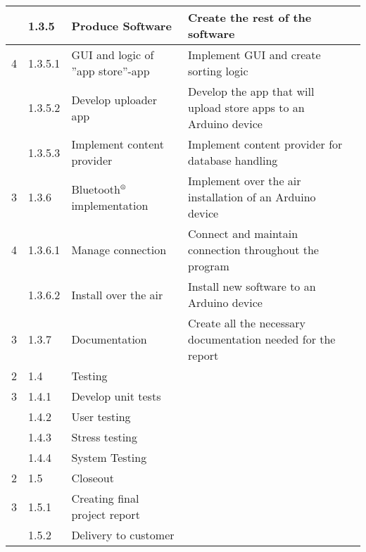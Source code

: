 \begin{longtable}{|m{}|m{}|m{}|m{}|m{}|}
\hline
	 & 1.3.5 & Produce Software & Create the rest of the software & \\
\hline
	4 & 1.3.5.1 & GUI and logic of ''app store''-app & Implement GUI and create sorting logic & \\
\hline
	 & 1.3.5.2 & Develop uploader app & Develop the app that will upload store apps to an Arduino device & \\
\hline
	 & 1.3.5.3 & Implement content provider & Implement content provider for database handling & \\
\hline
	3 & 1.3.6 & Bluetooth$\textsuperscript{\textregistered}$ implementation & Implement over the air installation of an Arduino device & \\
\hline
	4 & 1.3.6.1 & Manage connection & Connect and maintain connection throughout the program & \\
\hline
	 & 1.3.6.2 & Install over the air & Install new software to an Arduino device & \\
\hline
	3 & 1.3.7 & Documentation & Create all the necessary documentation needed for the report & \\
\hline
	2 & 1.4 & Testing & & \\
\hline
	3 & 1.4.1 & Develop unit tests & & \\
\hline
	 & 1.4.2 & User testing & & \\
\hline
	 & 1.4.3 & Stress testing & & \\
\hline
	 & 1.4.4 & System Testing & & \\
\hline
	2 & 1.5 & Closeout & & \\
\hline
	3 & 1.5.1 & Creating final project report & & \\
\hline
	 & 1.5.2 & Delivery to customer & & \\
\hline
\end{longtable}